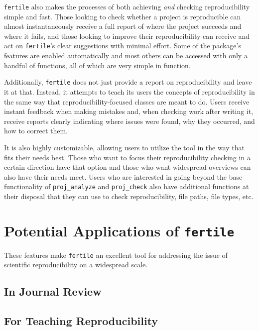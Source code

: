 \documentclass[12pt,twoside]{reedthesis}
\begin{document}
\texttt{fertile} also makes the processes of both achieving \emph{and}
checking reproducibility simple and fast. Those looking to check whether
a project is reproducible can almost instantaneously receive a full
report of where the project succeeds and where it fails, and those
looking to improve their reproducibility can receive and act on
\texttt{fertile}'s clear suggestions with minimal effort. Some of the
package's features are enabled automatically and most others can be
accessed with only a handful of functions, all of which are very simple
in function.

Additionally, \texttt{fertile} does not just provide a report on
reproducibility and leave it at that. Instead, it attempts to teach its
users the concepts of reproducibility in the same way that
reproducibility-focused classes are meant to do. Users receive instant
feedback when making mistakes and, when checking work after writing it,
receive reports clearly indicating where issues were found, why they
occurred, and how to correct them.

It is also highly customizable, allowing users to utilize the tool in
the way that fits their needs best. Those who want to focus their
reproducibility checking in a certain direction have that option and
those who want widespread overviews can also have their needs meet.
Users who are interested in going beyond the base functionality of
\texttt{proj\_analyze} and \texttt{proj\_check} also have additional
functions at their disposal that they can use to check reproducibility,
file paths, file types, etc.

\section{\texorpdfstring{Potential Applications of
\texttt{fertile}}{Potential Applications of fertile}}\label{potential-applications-of-fertile}

These features make \texttt{fertile} an excellent tool for addressing
the issue of scientific reproducibility on a widespread scale.

\subsection{In Journal Review}\label{in-journal-review}

\subsection{For Teaching
Reproducibility}\label{for-teaching-reproducibility}
\end{document}
